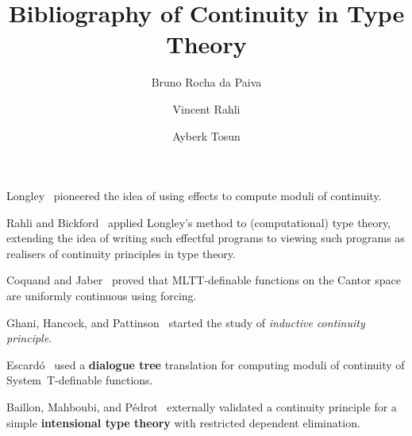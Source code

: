 \documentclass[a4paper]{article}
\title{Bibliography of Continuity in Type Theory}
\author{Bruno Rocha da Paiva \and Vincent Rahli \and Ayberk Tosun}
\begin{document}
\maketitle

Longley~\cite{longley-not-a-functional-program-1999} pioneered the idea of using
effects to compute moduli of continuity.

Rahli and Bickford~\cite{rahli-bickford-mscs-2018} applied Longley's method to
(computational) type theory, extending the idea of writing such effectful
programs to viewing such programs as realisers of continuity principles in type
theory.

Coquand and Jaber~\cite{coq-jaber-forcing-2012} proved that MLTT-definable
functions on the Cantor space are uniformly continuous using forcing.

Ghani, Hancock, and Pattinson~\cite{ghp-continuous-functions-2006} started the
study of \emph{inductive continuity principle}.

Escard\'o~\cite{mhe-effectful-forcing-2013} used a \textbf{dialogue tree}
translation for computing moduli of continuity of System~T-definable functions.

Baillon, Mahboubi, and P\'edrot~\cite{bmp-pythia-2022} externally validated a
continuity principle for a simple \textbf{intensional type theory} with
restricted dependent elimination.
\end{document}
